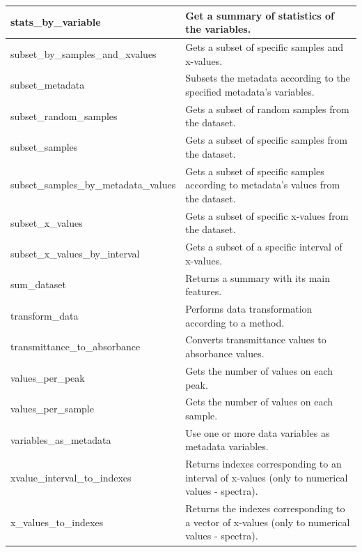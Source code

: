 \begin{scriptsize}
\begin{longtable}{|m{4.3cm}|m{11cm}|}
		\hline
		stats\_by\_variable & Get a summary of statistics of the variables. \\
		
		\hline
		subset\_by\_samples\_and\_xvalues & Gets a subset of specific samples and x-values. \\
		
		\hline
		subset\_metadata & Subsets the metadata according to the specified metadata's variables. \\
		
		\hline
		subset\_random\_samples & Gets a subset of random samples from the dataset. \\
		
		\hline
		subset\_samples & Gets a subset of specific samples from the dataset. \\
		
		\hline
		subset\_samples\_by\_metadata\_values & Gets a subset of specific samples according to metadata’s values from the dataset. \\
		
		\hline
		subset\_x\_values & Gets a subset of specific x-values from the dataset. \\
		
		\hline
		subset\_x\_values\_by\_interval & Gets a subset of a specific interval of x-values. \\
		
		\hline
		sum\_dataset & Returns a summary with its main features. \\
		
		\hline
		transform\_data & Performs data transformation according to a method. \\
		
		\hline
		transmittance\_to\_absorbance & Converts transmittance values to absorbance values. \\
		
		\hline
		values\_per\_peak & Gets the number of values on each peak. \\
		
		\hline
		values\_per\_sample & Gets the number of values on each sample. \\
		
		\hline
		variables\_as\_metadata & Use one or more data variables as metadata variables. \\
		
		\hline
		xvalue\_interval\_to\_indexes & Returns indexes corresponding to an interval of x-values (only to numerical values - spectra). \\
		
		\hline
		x\_values\_to\_indexes & Returns the indexes corresponding to a vector of x-values (only to numerical values - spectra). \\
		
		\hline
		
	\end{longtable}
\end{scriptsize}


